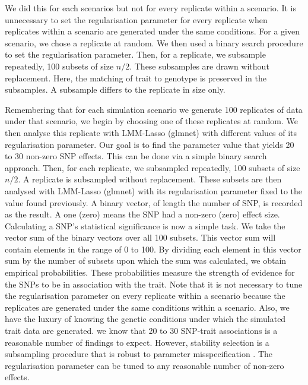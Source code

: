 \documentclass{article}
\begin{document}
 


We did this for each  scenarios but not for every replicate within a scenario. It is unnecessary to set the regularisation parameter 
for every replicate when replicates within a scenario are generated under the same conditions. 
For a given scenario, we chose a replicate at random.  We then used a binary search procedure to set the regularisation parameter. 
Then, for a replicate, we subsample repeatedly, 100 subsets of size $n/2$. These subsamples are drawn without replacement.  
Here, the matching of trait to genotype is preserved in the subsamples. A subsample differs to the replicate in size only. 




Remembering that for each simulation scenario we generate 100 
replicates of data under that scenario, we begin by choosing one of these replicates at random. 
We then analyse this replicate with LMM-Lasso (glmnet) with different values of its  regularisation parameter. 
Our goal is to find the parameter value that  yields 20 to 30 non-zero SNP effects. 
This can be done via a simple binary search approach. 
 Then, for each replicate, we subsampled repeatedly, 100 subsets of size $n/2$.  A replicate is subsampled without replacement.  
 These subsets are then analysed with LMM-Lasso (glmnet) with its regularisation parameter fixed to the value found previously. 
A binary vector, of length the number of SNP, is recorded as the result. 
A one (zero) means the SNP had a non-zero (zero) effect size. 
Calculating a SNP's statistical significance is now a simple task. We take the vector sum of the binary vectors over all 100 subsets. 
This vector sum will contain elements in the range of 0 to 100. By dividing each element in this vector sum by the number of 
subsets upon which the sum was calculated, we obtain empirical probabilities.  
 These 
probabilities measure the strength of evidence for the SNPs to be in association with the trait. 
 Note that it is not 
necessary to tune the regularisation   parameter on every replicate within a scenario because the replicates are generated under the same conditions within a scenario. Also, 
we have the luxury of knowing the genetic conditions 
under which the simulated trait data are generated. we know that 20 to 30 SNP-trait associations is a reasonable number of findings to expect. 
 However, stability selection is a subsampling procedure that is robust to parameter misspecification \citep{meinshausen2010stability}. 
 The regularisation parameter can be tuned to any reasonable number of 
 non-zero effects. 
\end{document}
